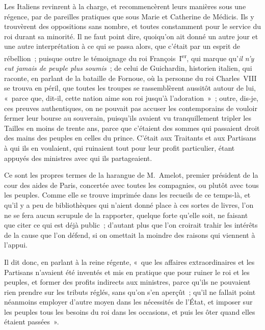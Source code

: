 \documentclass[french,twoside]{book} %
\begin{document}
Les Italiens revinrent à la charge, et recommencèrent leurs manières sous une régence, par de pareilles pratiques que sous Marie et Catherine de Médicis. Ils y trouvèrent des oppositions sans nombre, et toutes constamment pour le service du roi durant sa minorité. Il ne faut point dire, quoiqu’on ait donné un autre jour et une autre interprétation à ce qui se passa alors, que c’était par un esprit de rébellion ; puisque outre le témoignage du roi François I\textsuperscript{er}, qui marque qu’{\itshape il n’y eut jamais de peuple plus soumis} ; de celui de Guichardin, historien italien, qui raconte, en parlant de la bataille de Fornoue, où la personne du roi Charles VIII se trouva en péril, que toutes les troupes se rassemblèrent aussitôt autour de lui, « parce que, dit-il, cette nation aime son roi jusqu’à l’adoration » ; outre, dis-je, ces preuves authentiques, on ne pouvait pas accuser les contemporains de vouloir fermer leur bourse au souverain, puisqu’ils avaient vu tranquillement tripler les Tailles en moins de trente ans, parce que c’étaient des sommes qui passaient droit des mains des peuples en celles du prince. C’était aux Traitants et aux Partisans à qui ils en voulaient, qui ruinaient tout pour leur profit particulier, étant appuyés des ministres avec qui ils partageaient.\par
Ce sont les propres termes de la harangue de M. Amelot, premier président de la cour des aides de Paris, concertée avec toutes les compagnies, ou plutôt avec tous les peuples. Comme elle se trouve imprimée dans les recueils de ce temps-là, et qu’il y a peu de bibliothèques qui n’aient donné place à ces sortes de livres, l’on ne se fera aucun scrupule de la rapporter, quelque forte qu’elle soit, ne faisant que citer ce qui est déjà public ; d’autant plus que l’on croirait trahir les intérêts de la cause que l’on défend, si on omettait la moindre des raisons qui viennent à l’appui.\par
Il dit donc, en parlant à la reine régente, « que les affaires extraordinaires et les Partisans n’avaient été inventés et mis en pratique que pour ruiner le roi et les peuples, et former des profits indirects aux ministres, parce qu’ils ne pouvaient rien prendre sur les tributs réglés, sans qu’on s’en aperçût ; qu’il ne fallait point néanmoins employer d’autre moyen dans les nécessités de l’État, et imposer sur les peuples tous les besoins du roi dans les occasions, et puis les ôter quand elles étaient passées ».\par
\end{document}
